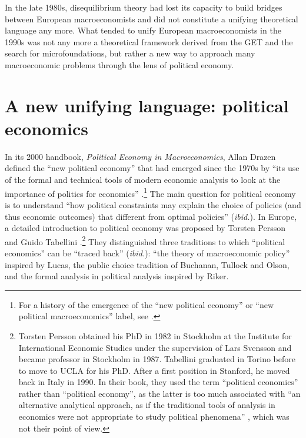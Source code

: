 \documentclass[]{elsarticle} %
\begin{document}
In the late 1980s, disequilibrium theory had lost its capacity to build
bridges between European macroeconomists and did not constitute a
unifying theoretical language any more. What tended to unify European
macroeconomists in the 1990s was not any more a theoretical framework
derived from the GET and the search for microfoundations, but rather a
new way to approach many macroeconomic problems through the lens of
political economy.

\hypertarget{political-economics}{%
\section{A new unifying language: political
economics}\label{political-economics}}

In its 2000 handbook, \emph{Political Economy in Macroeconomics}, Allan
Drazen defined the ``new political economy'' that had emerged since the
1970s by ``its use of the formal and technical tools of modern economic
analysis to look at the importance of politics for economics''
\citep[4]{drazen2002}.\footnote{For a history of the emergence of the
  ``new political economy'' or ``new political macroeconomics'' label,
  see \citet{galvaodealmeida2021}.} The main question for political
economy is to understand ``how political constraints may explain the
choice of policies (and thus economic outcomes) that different from
optimal policies'' (\emph{ibid.}). In Europe, a detailed introduction to
political economy was proposed by Torsten Persson and Guido Tabellini
\citeyearpar{persson2002}.\footnote{Torsten Persson obtained his PhD in
  1982 in Stockholm at the Institute for International Economic Studies
  under the supervision of Lars Svensson and became professor in
  Stockholm in 1987. Tabellini graduated in Torino before to move to
  UCLA for his PhD. After a first position in Stanford, he moved back in
  Italy in 1990. In their book, they used the term ``political
  economics'' rather than ``political economy'', as the latter is too
  much associated with ``an alternative analytical approach, as if the
  traditional tools of analysis in economics were not appropriate to
  study political phenomena'' \citep[2]{persson2002}, which was not
  their point of view.} They distinguished three traditions to which
``political economics'' can be ``traced back'' (\emph{ibid.}): ``the
theory of macroeconomic policy'' inspired by Lucas, the public choice
tradition of Buchanan, Tullock and Olson, and the formal analysis in
political analysis inspired by Riker.
\end{document}
